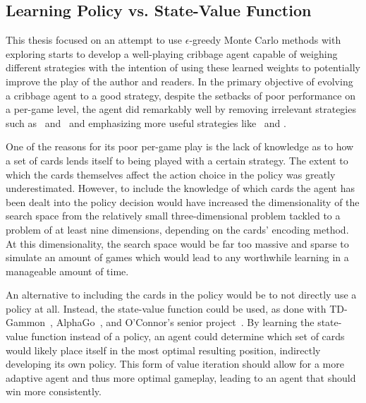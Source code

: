
\subsection{Learning Policy vs. State-Value Function}
\label{sec:disc-value}

This thesis focused on an attempt to use
$\epsilon$-greedy Monte Carlo methods with exploring starts
to develop a well-playing
cribbage agent capable of weighing different strategies
with the intention of using these learned weights to 
potentially
improve the play of the author and readers.
%
In the primary objective of evolving a cribbage agent to a good strategy,
despite the setbacks of poor performance on a per-game level,
the agent did remarkably well
by removing irrelevant strategies
such as \handmaxmed\ and \peggingmaxmedgained\ 
and emphasizing more useful strategies
like \handmaxavg\ and \handmaxmin.

One of the reasons for its poor per-game play
is the lack of knowledge as to how a set of cards lends itself to being played
with a certain strategy.
%
The extent to which the cards themselves affect the action choice in the policy
was greatly underestimated.
%
However,
to include the knowledge of which cards the agent has been dealt into the policy decision
would have increased the dimensionality of the search space from the relatively
small three-dimensional problem tackled to a problem of at least nine
dimensions,
depending on the cards' encoding method.
%
At this dimensionality,
the search space would be far too massive and sparse to simulate an amount of
games which would lead to any worthwhile learning
in a manageable amount of time.

An alternative to including the cards in the policy would be to not
directly use a policy at all.
%
Instead,
the state-value function could be used,
as done with TD-Gammon~\cite{tdgammon},
AlphaGo~\cite{deepmind_alphago,deepmind_alphago_zero},
and O'Connor's senior project~\cite{roconnor_cs486}.
%
By learning the state-value function instead of a policy,
an agent could determine which set of cards would likely place itself in the
most optimal resulting position,
indirectly developing its own policy.
%
This form of value iteration should allow for a more adaptive agent
and thus more optimal gameplay,
leading to an agent that should win more consistently.

%

